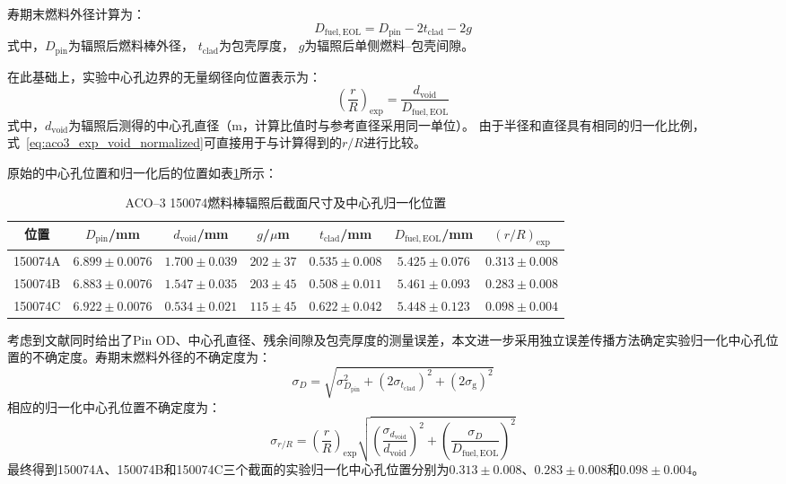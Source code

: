 寿期末燃料外径计算为：
\begin{equation}
	D_{\mathrm{fuel,EOL}}
	=
	D_{\mathrm{pin}}
	-2t_{\mathrm{clad}}
	-2g 
	\label{eq:aco3_eol_fuel_diameter}
\end{equation}
\noindent 式中，$D_{\mathrm{pin}}$为辐照后燃料棒外径，
$t_{\mathrm{clad}}$为包壳厚度，
$g$为辐照后单侧燃料--包壳间隙。

在此基础上，实验中心孔边界的无量纲径向位置表示为：
\begin{equation}
	\left(\frac{r}{R}\right)_{\mathrm{exp}}
	=
	\frac{d_{\mathrm{void}}}
	{D_{\mathrm{fuel,EOL}}}
	\label{eq:aco3_exp_void_normalized}
\end{equation}
\noindent 式中，$d_{\mathrm{void}}$为辐照后测得的中心孔直径（$\mathrm{m}$，计算比值时与参考直径采用同一单位）。
由于半径和直径具有相同的归一化比例，式~\eqref{eq:aco3_exp_void_normalized}可直接用于与计算得到的$r/R$进行比较。

原始的中心孔位置和归一化后的位置如表\ref{tab:aco3_eol_void_dimension}所示：

\begin{table}[htbp]
	\centering
	\caption{ACO--3 150074燃料棒辐照后截面尺寸及中心孔归一化位置}
	\label{tab:aco3_eol_void_dimension}
	\setlength{\tabcolsep}{4pt}
\begin{tabular}{ccccccc}
		\toprule
		位置 &
		$D_{\mathrm{pin}}$/mm &
		$d_{\mathrm{void}}$/mm &
		$g$/$\mu$m &
		$t_{\mathrm{clad}}$/mm &
		$D_{\mathrm{fuel,EOL}}$/mm &
		$(r/R)_{\mathrm{exp}}$ \\
		\midrule
		150074A &
		$6.899\pm0.0076$ &
		$1.700\pm0.039$ &
		$202\pm37$ &
		$0.535\pm0.008$ &
		$5.425\pm0.076$ &
		$0.313\pm0.008$ \\
		
		150074B &
		$6.883\pm0.0076$ &
		$1.547\pm0.035$ &
		$203\pm45$ &
		$0.508\pm0.011$ &
		$5.461\pm0.093$ &
		$0.283\pm0.008$ \\
		
		150074C &
		$6.922\pm0.0076$ &
		$0.534\pm0.021$ &
		$115\pm45$ &
		$0.622\pm0.042$ &
		$5.448\pm0.123$ &
		$0.098\pm0.004$ \\
		\bottomrule
	\end{tabular}
\end{table}

考虑到文献同时给出了Pin OD、中心孔直径、残余间隙及包壳厚度的测量误差，本文进一步采用独立误差传播方法确定实验归一化中心孔位置的不确定度。寿期末燃料外径的不确定度为：
\begin{equation}
	\sigma_D
	=
	\sqrt{
		\sigma_{D_{\mathrm{pin}}}^{2}
		+(2\sigma_{t_{\mathrm{clad}}})^{2}
		+(2\sigma_{\mathrm g})^{2}
	}
\end{equation}
相应的归一化中心孔位置不确定度为：
\begin{equation}
	\sigma_{r/R}
	=
	\left(\frac{r}{R}\right)_{\mathrm{exp}}
	\sqrt{
		\left(
		\frac{\sigma_{d_{\mathrm{void}}}}
		{d_{\mathrm{void}}}
		\right)^2
		+
		\left(
		\frac{\sigma_D}
		{D_{\mathrm{fuel,EOL}}}
		\right)^2
	}
\end{equation}
最终得到150074A、150074B和150074C三个截面的实验归一化中心孔位置分别为$0.313\pm0.008$、$0.283\pm0.008$和$0.098\pm0.004$。

